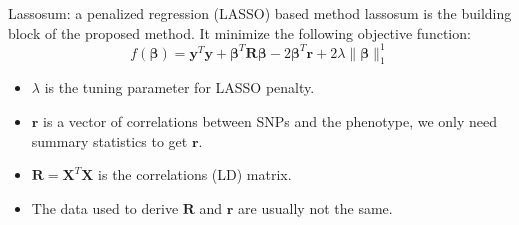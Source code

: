 \documentclass{beamer}
\begin{document}
\begin{frame}{Lassosum: a penalized regression (LASSO) based method \citep{mak2017polygenic}}
lassosum is the building block of the proposed method.
It minimize the following objective function:
    $$
f(\boldsymbol{\beta})=\boldsymbol{y}^{T} \boldsymbol{y}+\boldsymbol{\beta}^{T} \boldsymbol{R} \boldsymbol{\beta}-2 \boldsymbol{\beta}^{T} \boldsymbol{r}+2 \lambda\|\boldsymbol{\beta}\|_{1}^{1}
     $$
\begin{itemize}
    \item $\lambda$ is the tuning parameter for LASSO penalty.
    \item $\boldsymbol{r}$ is a vector of correlations between SNPs and the phenotype, we only need summary statistics to get $\boldsymbol{r}$.
    \item $\boldsymbol{R}=\boldsymbol{X}^{T} \boldsymbol{X}$ is the correlations (LD) matrix.
    \item The data used to derive $\boldsymbol{R}$ and $\boldsymbol{r}$ are usually not the same.
\end{itemize}

\end{frame}
\end{document}
